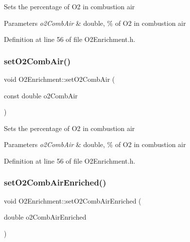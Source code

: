 Sets the percentage of O2 in combustion air 
\begin{DoxyParams}{Parameters}
{\em o2\+Comb\+Air} & double, \% of O2 in combustion air \\
\hline
\end{DoxyParams}


Definition at line 56 of file O2\+Enrichment.\+h.

\mbox{\label{class_o2_enrichment_a4ed21239c9e2ed2b193c94e9df0a9079}} 
\subsubsection{\texorpdfstring{set\+O2\+Comb\+Air()}{setO2CombAir()}\hspace{0.1cm}{\footnotesize\ttfamily [3/3]}}
{\footnotesize\ttfamily void O2\+Enrichment\+::set\+O2\+Comb\+Air (\begin{DoxyParamCaption}\item[{const double}]{o2\+Comb\+Air }\end{DoxyParamCaption})\hspace{0.3cm}{\ttfamily [inline]}}

Sets the percentage of O2 in combustion air 
\begin{DoxyParams}{Parameters}
{\em o2\+Comb\+Air} & double, \% of O2 in combustion air \\
\hline
\end{DoxyParams}


Definition at line 56 of file O2\+Enrichment.\+h.

\mbox{\label{class_o2_enrichment_af781223d8201c4e5a1d0085718b0b36c}} 
\subsubsection{\texorpdfstring{set\+O2\+Comb\+Air\+Enriched()}{setO2CombAirEnriched()}\hspace{0.1cm}{\footnotesize\ttfamily [1/3]}}
{\footnotesize\ttfamily void O2\+Enrichment\+::set\+O2\+Comb\+Air\+Enriched (\begin{DoxyParamCaption}\item[{double}]{o2\+Comb\+Air\+Enriched }\end{DoxyParamCaption})\hspace{0.3cm}{\ttfamily [inline]}}

